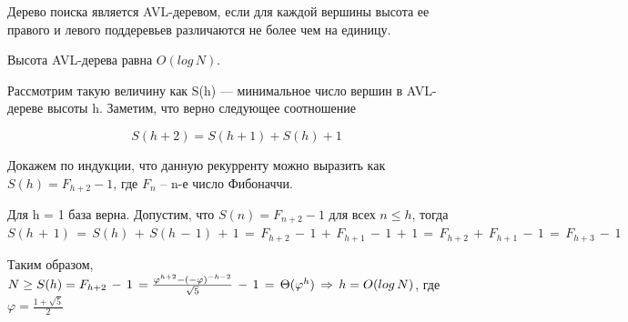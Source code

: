 \Def Дерево поиска является AVL-деревом, если для каждой вершины
высота ее правого и левого поддеревьев различаются не более чем на
единицу.

\Th Высота AVL-дерева равна $O(log\,N)$.

\Proof Рассмотрим такую величину как S(h) — минимальное число вершин в AVL-дереве высоты h. Заметим, что верно следующее соотношение

$$S(h + 2) = S(h + 1) + S(h) + 1$$

Докажем по индукции, что данную рекурренту можно выразить как $S(h) = F_{h+2} - 1$, где $F_n$ -- n-е число Фибоначчи.

Для h = 1 база верна.
Допустим, что $S(n) = F_{n+2} - 1$ для всех $n \leq h$, тогда
$S(h\,+\,1)\,=\,S(h)\,+\,S(h\,-\,1)\,+\,1\,=\,F_{h+2}\,-\,1\,+\,F_{h+1}\,-\,1\,+\,1\,=\,F_{h+2}\,+\,F_{h+1}\,-\,1\,=\,F_{h+3}\,-\,1$

Таким образом, $N \geq S(h) = F_{h+2}\,-\,1\,={\large\frac{\varphi^{h+2}-(-\varphi)^{-h-2}}{\sqrt{5}}}\,-\,1\,=\,\Theta(\varphi^h)\,\Rightarrow\,h=O(log\,N)$, где $\varphi = \frac{1 + \sqrt{5}}{2}$ \Endproof

\pagebreak